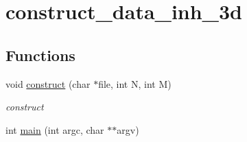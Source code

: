 \hypertarget{group__applications__mri2d__construct__data__inh__3d}{
\section{construct\_\-data\_\-inh\_\-3d}
\label{group__applications__mri2d__construct__data__inh__3d}
}
\subsection*{Functions}
\begin{CompactItemize}
\item 
\hypertarget{group__applications__mri2d__construct__data__inh__3d_g838247ac80ab4e2ac246eb969422bda1}{
void \hyperlink{group__applications__mri2d__construct__data__inh__3d_g838247ac80ab4e2ac246eb969422bda1}{construct} (char $\ast$file, int N, int M)}
\label{group__applications__mri2d__construct__data__inh__3d_g838247ac80ab4e2ac246eb969422bda1}

\begin{CompactList}\small\item\em construct \item\end{CompactList}\item 
\hypertarget{group__applications__mri2d__construct__data__inh__3d_g3c04138a5bfe5d72780bb7e82a18e627}{
int \hyperlink{group__applications__mri2d__construct__data__inh__3d_g3c04138a5bfe5d72780bb7e82a18e627}{main} (int argc, char $\ast$$\ast$argv)}
\label{group__applications__mri2d__construct__data__inh__3d_g3c04138a5bfe5d72780bb7e82a18e627}

\end{CompactItemize}
